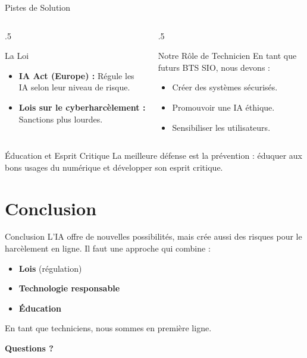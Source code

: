 \documentclass[10pt, aspectratio=169]{beamer}
\begin{document}
\begin{frame}{Pistes de Solution}

  \begin{columns}[T]
    \begin{column}{.5\textwidth}
      \begin{block}{La Loi}
        \begin{itemize}
          \item \textbf{IA Act (Europe) :} Régule les IA selon leur niveau de risque.
          \item \textbf{Lois sur le cyberharcèlement :} Sanctions plus lourdes.
        \end{itemize}
      \end{block}
    \end{column}
    \begin{column}{.5\textwidth}
      \begin{alertblock}{Notre Rôle de Technicien}
        En tant que futurs BTS SIO, nous devons :
        \begin{itemize}
          \item Créer des systèmes sécurisés.
          \item Promouvoir une IA éthique.
          \item Sensibiliser les utilisateurs.
        \end{itemize}
      \end{alertblock}
    \end{column}
  \end{columns}

  \begin{block}{Éducation et Esprit Critique}
    La meilleure défense est la prévention : éduquer aux bons usages du numérique et développer son esprit critique.
  \end{block}
\end{frame}

\section{Conclusion}

\begin{frame}{Conclusion}
  L'IA offre de nouvelles possibilités, mais crée aussi des risques pour le harcèlement en ligne.
  \vfill
  Il faut une approche qui combine :
  \begin{itemize}
      \item \textbf{Lois} (régulation)
      \item \textbf{Technologie responsable}
      \item \textbf{Éducation}
  \end{itemize}
  \vfill
  En tant que techniciens, nous sommes en première ligne.
\end{frame}

\begin{frame}
    \centering
    \Huge\bfseries Questions ?
\end{frame}
\end{document}
